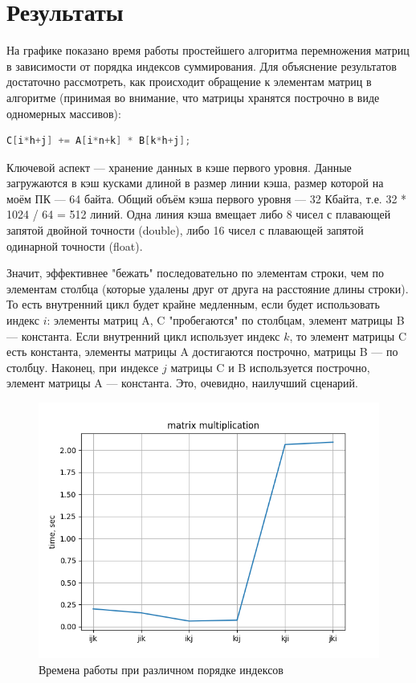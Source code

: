 \documentclass[14pt]{extarticle}
\begin{document}
\section*{Результаты}
На графике показано время работы простейшего алгоритма перемножения матриц в зависимости от порядка индексов суммирования. Для объяснение результатов достаточно рассмотреть, как происходит обращение к элементам матриц в алгоритме (принимая во внимание, что матрицы хранятся построчно в виде одномерных массивов):
\begin{lstlisting}[language=C]
C[i*h+j] += A[i*n+k] * B[k*h+j];
\end{lstlisting}
Ключевой аспект --- хранение данных в кэше первого уровня. Данные загружаются в кэш кусками длиной в размер линии кэша, размер которой на моём ПК --- 64 байта. Общий объём кэша первого уровня --- 32 Кбайта, т.е. 32 * 1024 / 64 = 512 линий. Одна линия кэша вмещает либо 8 чисел с плавающей запятой двойной точности (double), либо 16 чисел с плавающей запятой одинарной точности (float).

Значит, эффективнее "бежать" последовательно по элементам строки, чем по элементам столбца (которые удалены друг от друга на расстояние длины строки). То есть внутренний цикл будет крайне медленным, если будет использовать индекс $i$: элементы матриц A, C "пробегаются" по столбцам, элемент матрицы B --- константа. Если внутренний цикл использует индекс $k$, то элемент матрицы C есть константа, элементы матрицы A достигаются построчно, матрицы B --- по столбцу. Наконец, при индексе $j$ матрицы C и B используется построчно, элемент матрицы A --- константа. Это, очевидно, наилучший сценарий.

\begin{figure}[H]
	\centering
	\includegraphics[scale=1]{Figure_1}
	\caption{Времена работы при различном порядке индексов}
\end{figure}
\end{document}
